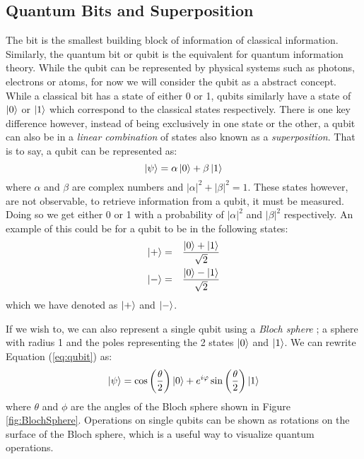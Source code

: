 \documentclass[reqno]{amsart}
\numberwithin{equation}{section}
\numberwithin{figure}{section}
\begin{document}
\subsection{Quantum Bits and Superposition} \label{sec:QubitsandSuperposition}
\begin{justify}
    The bit is the smallest building block of information of classical information. Similarly, the quantum bit or qubit is the equivalent for quantum information theory. \cite{Aaronson2013} While the qubit can be represented by physical systems such as photons, electrons or atoms, for now we will consider the qubit as a abstract concept. \\

    While a classical bit has a state of either 0 or 1, qubits similarly have a state of $\ket{0}$ or $\ket{1}$ which correspond to the classical states respectively. There is one key difference however, instead of being exclusively in one state or the other, a qubit can also be in a \textit{linear combination} of states also known as a \textit{superposition}. That is to say, a qubit can be represented as:
    \begin{equation}
        \ket{\psi} = \alpha\ket{0} + \beta\ket{1} \label{eq:qubit}
    \end{equation}
where $\alpha$ and $\beta$ are complex numbers and $|\alpha|^{2} + |\beta|^{2} = 1$. These states however, are not observable, to retrieve information from a qubit, it must be measured. Doing so we get either 0 or 1 with a probability of $|\alpha|^{2}$ and $|\beta|^{2}$ respectively. An example of this could be for a qubit to be in the following states:
    \begin{eqnarray}
        \ket{+} &=& \frac{\ket{0} + \ket{1}}{\sqrt{2}} \label{eqn:+} \\
        \ket{-} &=& \frac{\ket{0} - \ket{1}}{\sqrt{2}} \label{eqn:-}
    \end{eqnarray}
which we have denoted as $\ket{+}$ and $\ket{-}$.

If we wish to, we can also represent a single qubit using a \textit{Bloch sphere} \cite{FeynmanRichardVernon1957}; a sphere with radius 1 and the poles representing the 2 states $\ket{0}$ and $\ket{1}$. We can rewrite Equation (\ref{eq:qubit}) as:
    \begin{equation}
        \ket{\psi} = \cos\left(\frac{\theta}{2}\right)\ket{0} + e^{i\varphi}\sin\left(\frac{\theta}{2}\right)\ket{1}
    \end{equation}
where $\theta$ and $\phi$ are the angles of the Bloch sphere shown in Figure \ref{fig:BlochSphere}. Operations on single qubits can be shown as rotations on the surface of the Bloch sphere, which is a useful way to visualize quantum operations. \\
    \begin{figure}[h]
        \centering
        \begin{tikzpicture}


\end{tikzpicture}
\end{figure}
\end{justify}
\end{document}
